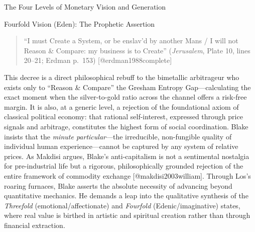 \documentclass[
  ignorenonframetext,
]{beamer}
\begin{document}
\begin{frame}{The Four Levels of Monetary Vision and Generation}
\begin{block}{Fourfold Vision (Eden): The Prophetic Assertion}
\begin{quote}
``I must Create a System, or be enslav'd by another Mans / I will not
Reason \& Compare: my business is to Create'' (\emph{Jerusalem}, Plate
10, lines 20--21; Erdman p.~153) {[}@erdman1988complete{]}
\end{quote}

This decree is a direct philosophical rebuff to the bimetallic
arbitrageur who exists only to ``Reason \& Compare'' the Gresham Entropy
Gap---calculating the exact moment when the silver-to-gold ratio across
the channel offers a risk-free margin. It is also, at a generic level, a
rejection of the foundational axiom of classical political economy: that
rational self-interest, expressed through price signals and arbitrage,
constitutes the highest form of social coordination. Blake insists that
the \emph{minute particular}---the irreducible, non-fungible quality of
individual human experience---cannot be captured by any system of
relative prices. As Makdisi argues, Blake's anti-capitalism is not a
sentimental nostalgia for pre-industrial life but a rigorous,
philosophically grounded rejection of the entire framework of commodity
exchange {[}@makdisi2003william{]}. Through Los's roaring furnaces,
Blake asserts the absolute necessity of advancing beyond quantitative
mechanics. He demands a leap into the qualitative synthesis of the
\emph{Threefold} (emotional/affectionate) and \emph{Fourfold}
(Edenic/imaginative) states, where real value is birthed in artistic and
spiritual creation rather than through financial extraction.


\end{block}
\end{frame}
\end{document}
